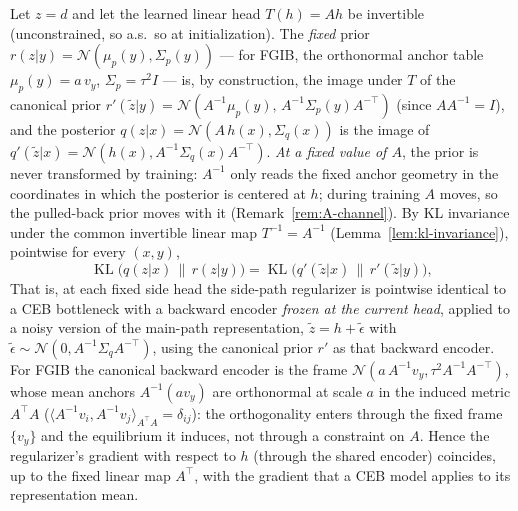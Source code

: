 \begin{proposition}\label{prop:fgib-ceb}
Let $z = d$ and let the learned linear head $T(h) = A h$ be invertible (unconstrained,
so a.s.\ so at initialization). The \emph{fixed}
prior $r(z|y) = \mathcal{N}(\mu_p(y), \Sigma_p(y))$ --- for FGIB, the orthonormal anchor
table $\mu_p(y) = a\,v_y$, $\Sigma_p = \tau^2 I$ --- is, by construction, the image
under $T$ of the canonical prior
$r'(\tilde{z}|y) = \mathcal{N}(A^{-1}\mu_p(y),\, A^{-1}\Sigma_p(y) A^{-\top})$
(since $A A^{-1} = I$), and the posterior $q(z|x) = \mathcal{N}(A\,h(x), \Sigma_q(x))$
is the image of
$q'(\tilde{z}|x) = \mathcal{N}(h(x), A^{-1}\Sigma_q(x) A^{-\top})$.
\emph{At a fixed value of $A$}, the prior is never transformed by training:
$A^{-1}$ only reads the fixed anchor geometry in the coordinates in which the posterior
is centered at $h$; during training $A$ moves, so the pulled-back prior moves with
it (Remark~\ref{rem:A-channel}).
By KL invariance under the common invertible linear map $T^{-1} = A^{-1}$
(Lemma~\ref{lem:kl-invariance}), pointwise for every $(x, y)$,
\begin{equation}
\operatorname{KL}\big(q(z|x)\,\|\,r(z|y)\big)
= \operatorname{KL}\big(q'(\tilde{z}|x)\,\|\,r'(\tilde{z}|y)\big),
\label{eq:fgib-ceb}
\end{equation}
That is, at each fixed side head the side-path regularizer is pointwise identical to a
CEB bottleneck with a backward encoder \emph{frozen at the current head}, applied to
a noisy version of the main-path representation,
$\tilde{z} = h + \tilde{\epsilon}$ with
$\tilde{\epsilon} \sim \mathcal{N}(0, A^{-1}\Sigma_q A^{-\top})$,
using the canonical prior $r'$ as that backward encoder. For FGIB the canonical backward
encoder is the frame $\mathcal{N}(a\,A^{-1} v_y, \tau^2 A^{-1}A^{-\top})$, whose
mean anchors $A^{-1}(a v_y)$ are orthonormal at scale $a$ in the induced metric
$A^{\top}A$
($\langle A^{-1}v_i, A^{-1}v_j\rangle_{A^{\top}A} = \delta_{ij}$): the orthogonality
enters through the fixed frame $\{v_y\}$ and the equilibrium it induces, not through a
constraint on $A$.
Hence the regularizer's gradient with respect to $h$ (through the shared encoder)
coincides, up to the fixed linear map $A^{\top}$, with the gradient that a CEB model
applies to its representation mean.
\end{proposition}

